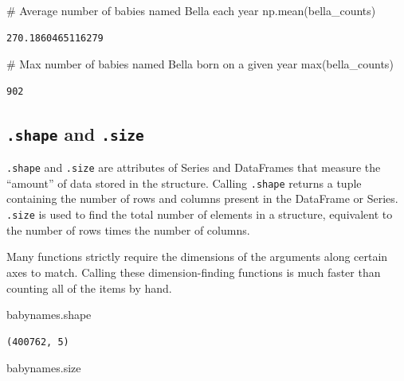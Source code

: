 \documentclass[
  letterpaper,
  DIV=11,
  numbers=noendperiod]{scrreprt}
\newenvironment{Shaded}{\begin{snugshade}}{\end{snugshade}}
\newcommand{\BuiltInTok}[1]{\textcolor[rgb]{0.00,0.23,0.31}{#1}}
\newcommand{\CommentTok}[1]{\textcolor[rgb]{0.37,0.37,0.37}{#1}}
\newcommand{\NormalTok}[1]{\textcolor[rgb]{0.00,0.23,0.31}{#1}}
\begin{document}
\begin{Shaded}
\begin{Highlighting}[]
\CommentTok{\# Average number of babies named Bella each year}
\NormalTok{np.mean(bella\_counts)}
\end{Highlighting}
\end{Shaded}

\begin{verbatim}
270.1860465116279
\end{verbatim}

\begin{Shaded}
\begin{Highlighting}[]
\CommentTok{\# Max number of babies named Bella born on a given year}
\BuiltInTok{max}\NormalTok{(bella\_counts)}
\end{Highlighting}
\end{Shaded}

\begin{verbatim}
902
\end{verbatim}

\hypertarget{shape-and-.size}{%
\subsection{\texorpdfstring{\texttt{.shape} and
\texttt{.size}}{.shape and .size}}\label{shape-and-.size}}

\texttt{.shape} and \texttt{.size} are attributes of Series and
DataFrames that measure the ``amount'' of data stored in the structure.
Calling \texttt{.shape} returns a tuple containing the number of rows
and columns present in the DataFrame or Series. \texttt{.size} is used
to find the total number of elements in a structure, equivalent to the
number of rows times the number of columns.

Many functions strictly require the dimensions of the arguments along
certain axes to match. Calling these dimension-finding functions is much
faster than counting all of the items by hand.

\begin{Shaded}
\begin{Highlighting}[]
\NormalTok{babynames.shape}
\end{Highlighting}
\end{Shaded}

\begin{verbatim}
(400762, 5)
\end{verbatim}

\begin{Shaded}
\begin{Highlighting}[]
\NormalTok{babynames.size}
\end{Highlighting}
\end{Shaded}
\end{document}
